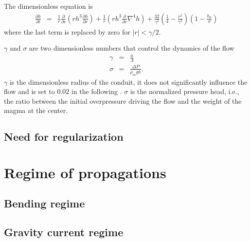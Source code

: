 The dimensionless equation is
\begin{eqnarray}
  \frac{\partial h}{\partial t}& =&\frac{1}{ r}
                                    \frac{\partial}{\partial r}  \left( rh^3  \frac{\partial h}{\partial
                                    r}\right)+\frac{1}{ r} \left( rh^3 \frac{\partial}{\partial r}\nabla^4h\right)+
                                    \frac{32}{\gamma^{2}}\left(\frac{1}{4}-\frac{r^{2}}{\gamma^{2}}\right)\left(1-\frac{h_0}{\sigma}\right)
\end{eqnarray}
where the last term is replaced by zero for $|r|<\gamma/2$.

$\gamma$ and $\sigma$  are two dimensionless numbers  that control the
dynamics of the flow
\begin{eqnarray}
  \gamma &=& \frac{a}{\Lambda}\\
  \sigma &=& \frac{\Delta P}{\rho_m g h}.
\end{eqnarray}
$\gamma$  is the  dimensionless radius  of  the conduit,  it does  not
significantly influence the flow and is set to $0.02$ in the following
\citep{Michaut:2009jx,Michaut:2011kg}.   $\sigma$  is  the  normalized
pressure  head,  i.e.,  the  ratio between  the  initial  overpressure
driving the flow and the weight of the magma at the center.
	 
\subsection{Need for regularization}
\label{sec:need-regularization}



\section{Regime of propagations}
\label{sec:regime-propagations}


\subsection{Bending regime}
\label{sec:bending-regime}

\subsection{Gravity current regime}
\label{sec:grav-curr-regime}


